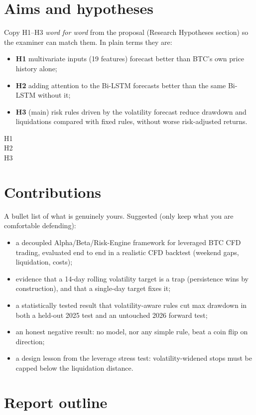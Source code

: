 \section{Aims and hypotheses}\label{sec:hypotheses}
\begin{guide}
Copy H1--H3 \emph{word for word} from the proposal (Research Hypotheses section) so the examiner can match them. In plain terms they are:
\begin{itemize}
  \item \textbf{H1} multivariate inputs (19 features) forecast better than BTC's own price history alone;
  \item \textbf{H2} adding attention to the Bi-LSTM forecasts better than the same Bi-LSTM without it;
  \item \textbf{H3} (main) risk rules driven by the volatility forecast reduce drawdown and liquidations compared with fixed rules, without worse risk-adjusted returns.
\end{itemize}
\end{guide}
\begin{description}
  \item[H1] 
  \item[H2] \tbc{}
  \item[H3] \tbc{}
\end{description}

\section{Contributions}
\begin{guide}
A bullet list of what is genuinely yours. Suggested (only keep what you are comfortable defending):
\begin{itemize}
  \item a decoupled Alpha/Beta/Risk-Engine framework for leveraged BTC CFD trading, evaluated end to end in a realistic CFD backtest (weekend gaps, liquidation, costs);
  \item evidence that a 14-day rolling volatility target is a trap (persistence wins by construction), and that a single-day target fixes it;
  \item a statistically tested result that volatility-aware rules cut max drawdown in both a held-out 2025 test and an untouched 2026 forward test;
  \item an honest negative result: no model, nor any simple rule, beat a coin flip on direction;
  \item a design lesson from the leverage stress test: volatility-widened stops must be capped below the liquidation distance.
\end{itemize}
\end{guide}
\tbc{}

\section{Report outline}
